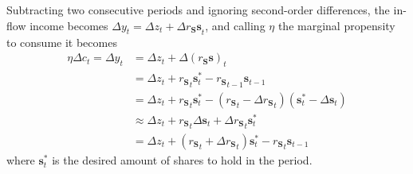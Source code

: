 \documentclass[a4paper, headings=standardclasses]{scrartcl}
\begin{document}
Subtracting two consecutive periods and ignoring second-order differences, the in-flow income becomes ${\Delta y}_t = {\Delta z}_t + {\Delta r_\mathbf{S} \mathbf{s} }_t$, and calling $\eta$ the marginal propensity to consume it becomes
\begin{align*}
	\eta {\Delta c}_t = {\Delta y}_t & = {\Delta z}_t + {\Delta (r_\mathbf{S} \mathbf{s})}_t                                                                                            \\
	                                 & = {\Delta z}_t + {r_\mathbf{S}}_t \mathbf{s}^*_t - {r_\mathbf{S}}_{t-1} \mathbf{s}_{t-1}                                                         \\
	                                 & = {\Delta z}_t + {r_\mathbf{S}}_t \mathbf{s}^*_t - ({r_\mathbf{S}}_{t} - {\Delta r_\mathbf{S}}_{t}) (\mathbf{s}^*_{t} - {\Delta \mathbf{s}}_{t}) \\
	                                 & \approx {\Delta z}_t + {r_\mathbf{S}}_t {\Delta \mathbf{s}}_t + {\Delta r_\mathbf{S}}_{t} \mathbf{s}^*_{t}                                       \\
	                                 & = {\Delta z}_t + ({r_\mathbf{S}}_t + {\Delta r_\mathbf{S}}_{t})\mathbf{s}^*_t - {r_\mathbf{S}}_{t} \mathbf{s}_{t-1}
\end{align*}
where $\mathbf{s}^*_t$ is the desired amount of shares to hold in the period.
\end{document}
